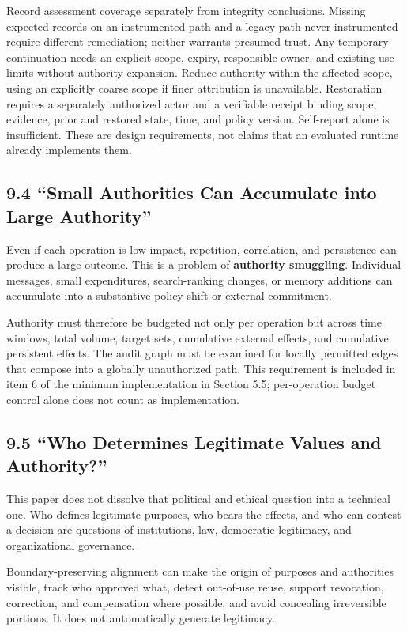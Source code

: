 Record assessment coverage separately from integrity conclusions. Missing expected records on an instrumented path and a legacy path never instrumented require different remediation; neither warrants presumed trust. Any temporary continuation needs an explicit scope, expiry, responsible owner, and existing-use limits without authority expansion. Reduce authority within the affected scope, using an explicitly coarse scope if finer attribution is unavailable. Restoration requires a separately authorized actor and a verifiable receipt binding scope, evidence, prior and restored state, time, and policy version. Self-report alone is insufficient. These are design requirements, not claims that an evaluated runtime already implements them.

\subsection{9.4 ``Small Authorities Can Accumulate into Large Authority''}\label{small-authorities-can-accumulate-into-large-authority}

Even if each operation is low-impact, repetition, correlation, and persistence can produce a large outcome. This is a problem of \textbf{authority smuggling}. Individual messages, small expenditures, search-ranking changes, or memory additions can accumulate into a substantive policy shift or external commitment.

Authority must therefore be budgeted not only per operation but across time windows, total volume, target sets, cumulative external effects, and cumulative persistent effects. The audit graph must be examined for locally permitted edges that compose into a globally unauthorized path. This requirement is included in item 6 of the minimum implementation in Section 5.5; per-operation budget control alone does not count as implementation.

\subsection{9.5 ``Who Determines Legitimate Values and Authority?''}\label{who-determines-legitimate-values-and-authority}

This paper does not dissolve that political and ethical question into a technical one. Who defines legitimate purposes, who bears the effects, and who can contest a decision are questions of institutions, law, democratic legitimacy, and organizational governance.

Boundary-preserving alignment can make the origin of purposes and authorities visible, track who approved what, detect out-of-use reuse, support revocation, correction, and compensation where possible, and avoid concealing irreversible portions. It does not automatically generate legitimacy.

